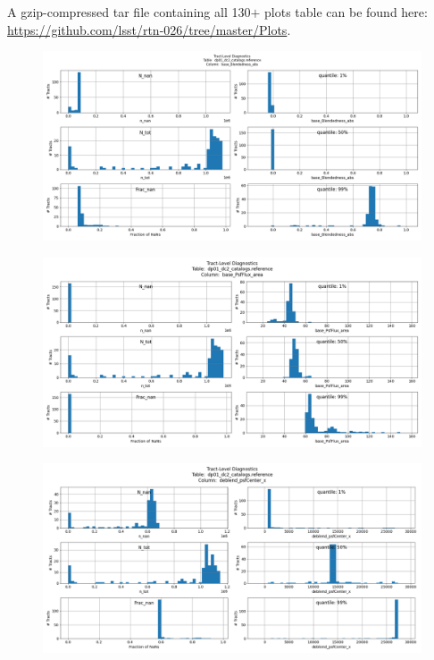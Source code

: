 \documentclass[DM,authoryear,toc]{lsstdoc}
\begin{document}
A gzip-compressed tar file containing all 130$+$ plots table can be
found here: \url{https://github.com/lsst/rtn-026/tree/master/Plots}.


\begin{figure}[h]
\centering
\includegraphics[width=1.0\linewidth]{Plots/TAP_verify_DP01.dp01_dc2_catalogs.reference.base_Blendedness_abs.png}
\caption{}
\label{fig:reference_base_blendednes_abs}
\end{figure}

\begin{figure}[h]
\centering
\includegraphics[width=1.0\linewidth]{Plots/TAP_verify_DP01.dp01_dc2_catalogs.reference.base_PsfFlux_area.png}
\caption{}
\label{fig:reference_base_psfflux_area}
\end{figure}

\begin{figure}[h]
\centering
\includegraphics[width=1.0\linewidth]{Plots/TAP_verify_DP01.dp01_dc2_catalogs.reference.deblend_psfCenter_x.png}
\caption{}
\label{fig:reference_deblend_psfcenter_x}
\end{figure}
\end{document}

